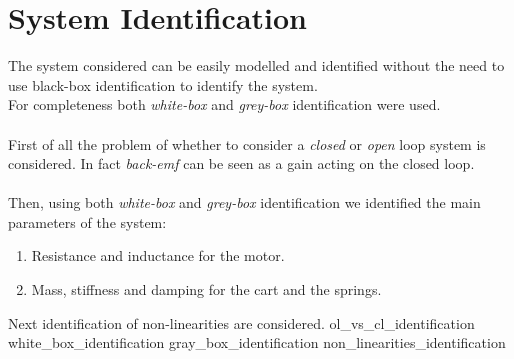 \chapter{System Identification}
The system considered can be easily modelled and identified without the need to use black-box identification to identify the system. \\ For completeness both \emph{white-box} and \emph{grey-box} identification were used.\\ \\
First of all the problem of whether to consider a \emph{closed} or \emph{open} loop system is considered. In fact \emph{back-emf} can be seen as a gain acting on the closed loop.\\ \\
Then, using both \emph{white-box} and \emph{grey-box} identification we identified the main parameters of the system: 
\begin{enumerate}
\item Resistance and inductance for the motor.
\item Mass, stiffness and damping for the cart and the springs.
\end{enumerate}
Next identification of non-linearities are considered.
{ol_vs_cl_identification}
\newpage
{white_box_identification}
\newpage
{gray_box_identification}
\newpage
{non_linearities_identification}